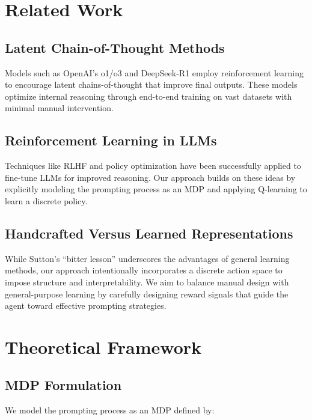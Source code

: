\documentclass[10pt,journal,compsoc]{IEEEtran}
\begin{document}
\section{Related Work}


\subsection{Latent Chain-of-Thought
Methods}

Models such as OpenAI's o1/o3 and DeepSeek-R1 employ reinforcement
learning to encourage latent chains-of-thought that improve final
outputs. These models optimize internal reasoning through end-to-end
training on vast datasets with minimal manual intervention.


\subsection{Reinforcement Learning in
LLMs}

Techniques like RLHF and policy optimization have been successfully
applied to fine-tune LLMs for improved reasoning. Our approach builds on
these ideas by explicitly modeling the prompting process as an MDP and
applying Q-learning to learn a discrete policy.


\subsection{Handcrafted Versus Learned
Representations}

While Sutton's ``bitter lesson'' underscores the advantages of general
learning methods, our approach intentionally incorporates a discrete
action space to impose structure and interpretability. We aim to balance
manual design with general-purpose learning by carefully designing
reward signals that guide the agent toward effective prompting
strategies.


\section{Theoretical Framework}


\subsection{MDP Formulation}

We model the prompting process as an MDP defined by:
\end{document}
